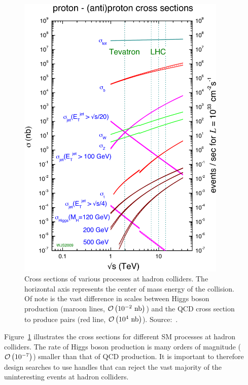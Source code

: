 \begin{figure}
  \centering
  \includegraphics[width=100mm,angle=00]{theory_chapter/figures/collider_crosssections.pdf}
  \caption[Cross sections of interest at hadron colliders]{Cross sections of
  various processes at hadron colliders.  The horizontal axis represents the
  center of mass energy of the collision.  Of note is the vast difference in
  scales between Higgs boson production (maroon lines, $\mbox{\ensuremath{\mathcal{O}\left(10^{-2}~\text{nb}\right)}}$) and the QCD
  cross section to produce \bbbar pairs (red line, $\mbox{\ensuremath{\mathcal{O}\left(10^4~\text{nb}\right)}}$).
  Source:~\cite{MSTWXSectionPlots}.} 
  \label{fig:HadronColliderCrossSections}
\end{figure}
Figure~\ref{fig:HadronColliderCrossSections} illustrates the cross sections for
different SM processes at hadron colliders.  The rate of Higgs boson production is
many orders of magnitude ($\mbox{\ensuremath{\mathcal{O}\left(10^{-7}\right)}}$) smaller than that of QCD production.  It
is important to therefore design searches to use handles that can reject the
vast majority of the uninteresting events at hadron colliders.  

